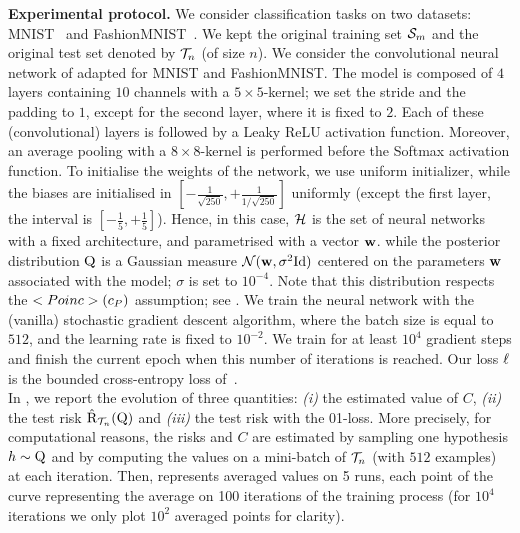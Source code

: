\noindent\textbf{Experimental protocol.} 
We consider classification tasks on two datasets: MNIST~\citep{lecun1998mnist} and FashionMNIST~\citep{xiao2017fashion}.
We kept the original training set $\mathcal{S}_m$ and the original test set denoted by $\mathcal{T}_n$ (of size $n$).
We consider the convolutional neural network of \citet{springenberg2015striving} adapted for MNIST and FashionMNIST.
The model is composed of $4$ layers containing $10$ channels with a $5{\times}5$-kernel; we set the stride and the padding to $1$, except for the second layer, where it is fixed to $2$. 
Each of these (convolutional) layers is followed by a Leaky ReLU activation function.
Moreover, an average pooling with a $8{\times}8$-kernel is performed before the Softmax activation function.
To initialise the weights of the network, we use \citet{glorot2010understanding} uniform initializer, while the biases are initialised in $[-\frac{1}{\sqrt{250}}, +\frac{1}{1/\sqrt{250}}]$ uniformly (except the first layer, the interval is $[-\frac{1}{5}, +\frac{1}{5}]$).
Hence, in this case, $\mathcal{H}$ is the set of neural networks with a fixed architecture, and parametrised with a vector $\mathbf{w}$.
while the posterior distribution $\mathrm{Q}$ is a Gaussian measure $\mathcal{N}(\mathbf{w}, \sigma^2\textrm{Id})$ centered on the parameters $\mathbf{w}$ associated with the model; $\sigma$ is set to $10^{-4}$. 
Note that this distribution respects the $<Poinc>(c_P)$ assumption; see .
We train the neural network with the (vanilla) stochastic gradient descent algorithm, where the batch size is equal to $512$, and the learning rate is fixed to $10^{-2}$.
We train for at least $10^{4}$ gradient steps and finish the current epoch when this number of iterations is reached.
Our loss $\ell$ is the bounded cross-entropy loss of~\citet[Section D]{dziugaite2017computing}.\\
In , we report the evolution of three quantities: {\it (i)} the estimated value of $C$, {\it (ii)} the test risk $\hat{\text{R}}_{\mathcal{T}_n}(\mathrm{Q})$ and {\it (iii)} the test risk with the 01-loss.
More precisely, for computational reasons, the risks and $C$ are estimated by sampling one hypothesis $h\sim\mathrm{Q}$ and by computing the values on a mini-batch of $\mathcal{T}_n$ (with $512$ examples) at each iteration.
Then,  represents averaged values on 5 runs, each point of the curve representing the average on 100 iterations of the training process (for $10^{4}$ iterations we only plot $10^{2}$ averaged points for clarity).

